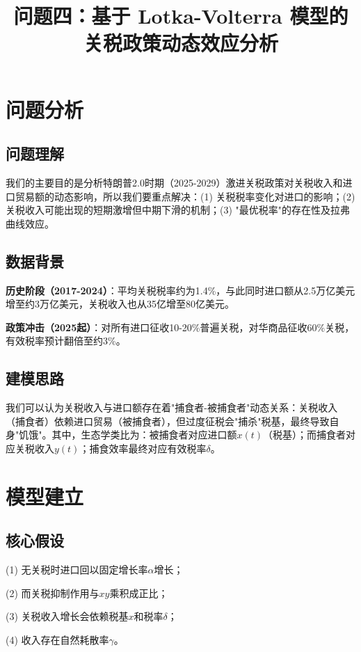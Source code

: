 \documentclass[11pt]{article}
\title{\textbf{问题四：基于 Lotka-Volterra 模型的关税政策动态效应分析}}
\author{}
\date{}
\begin{document}
\maketitle
\vspace{-0.8cm}

\section{问题分析}

\subsection{问题理解}
我们的主要目的是分析特朗普2.0时期（2025-2029）激进关税政策对关税收入和进口贸易额的动态影响，所以我们要重点解决：(1) 关税税率变化对进口的影响；(2) 关税收入可能出现的短期激增但中期下滑的机制；(3) "最优税率"的存在性及拉弗曲线效应。

\subsection{数据背景}
\textbf{历史阶段（2017-2024）}：平均关税税率约为1.4\%，与此同时进口额从2.5万亿美元增至约3万亿美元，关税收入也从35亿增至80亿美元。

\textbf{政策冲击（2025起）}：对所有进口征收10-20\%普遍关税，对华商品征收60\%关税，有效税率预计翻倍至约3\%。

\subsection{建模思路}
我们可以认为关税收入与进口额存在着"捕食者-被捕食者"动态关系：关税收入（捕食者）依赖进口贸易（被捕食者），但过度征税会"捕杀"税基，最终导致自身"饥饿"。其中，生态学类比为：被捕食者对应进口额$x(t)$（税基）；而捕食者对应关税收入$y(t)$；捕食效率最终对应有效税率$\delta$。

\section{模型建立}

\subsection{核心假设}
(1) 无关税时进口回以固定增长率$\alpha$增长；

(2) 而关税抑制作用与$xy$乘积成正比；

(3) 关税收入增长会依赖税基$x$和税率$\delta$；

(4) 收入存在自然耗散率$\gamma$。
\end{document}
